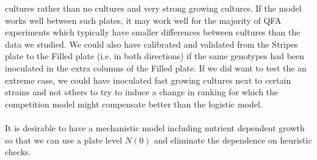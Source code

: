 cultures rather than no cultures and very strong growing cultures. If
the model works well between such plates, it may work well for the
majority of QFA experiments which typically have smaller differences
between cultures than the data we studied. We could also have
calibrated and validated from the Stripes plate to the Filled plate
(i.e. in both directions) if the same genotypes had been inoculated in
the extra columns of the Filled plate. If we did want to test the an
extreme case, we could have inoculated fast growing cultures next to
certain strains and not others to try to induce a change in ranking
for which the competition model might compensate better than the
logistic model.
\\\\
It is desirable to have a mechanistic model including nutrient
dependent growth so that we can use a plate level \(N(0)\) and
eliminate the dependence on heuristic checks.






